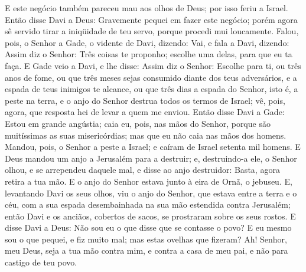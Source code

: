 E este negócio também pareceu mau aos olhos de Deus; por isso
feriu a Israel. Então disse Davi a Deus: Gravemente pequei em
fazer este negócio; porém agora sê servido tirar a iniqüidade de teu
servo, porque procedi mui loucamente. Falou, pois, o Senhor a
Gade, o vidente de Davi, dizendo: Vai, e fala a Davi,
dizendo: Assim diz o Senhor: Três coisas te proponho; escolhe uma
delas, para que eu ta faça. E Gade veio a Davi, e lhe disse:
Assim diz o Senhor: Escolhe para ti, ou três anos de fome, ou
que três meses sejas consumido diante dos teus adversários, e a
espada de teus inimigos te alcance, ou que três dias a espada do
Senhor, isto é, a peste na terra, e o anjo do Senhor destrua todos
os termos de Israel; vê, pois, agora, que resposta hei de levar a
quem me enviou. Então disse Davi a Gade: Estou em grande
angústia; caia eu, pois, nas mãos do Senhor, porque são muitíssimas
as suas misericórdias; mas que eu não caia nas mãos dos homens.
Mandou, pois, o Senhor a peste a Israel; e caíram de Israel
setenta mil homens. E Deus mandou um anjo a Jerusalém para a
destruir; e, destruindo-a ele, o Senhor olhou, e se arrependeu
daquele mal, e disse ao anjo destruidor: Basta, agora retira a tua
mão. E o anjo do Senhor estava junto à eira de Ornã, o jebuseu.
E, levantando Davi os seus olhos, viu o anjo do Senhor, que
estava entre a terra e o céu, com a sua espada desembainhada na sua
mão estendida contra Jerusalém; então Davi e os anciãos, cobertos de
sacos, se prostraram sobre os seus rostos. E disse Davi a
Deus: Não sou eu o que disse que se contasse o povo? E eu mesmo sou
o que pequei, e fiz muito mal; mas estas ovelhas que fizeram? Ah!
Senhor, meu Deus, seja a tua mão contra mim, e contra a casa de meu
pai, e não para castigo de teu povo.

